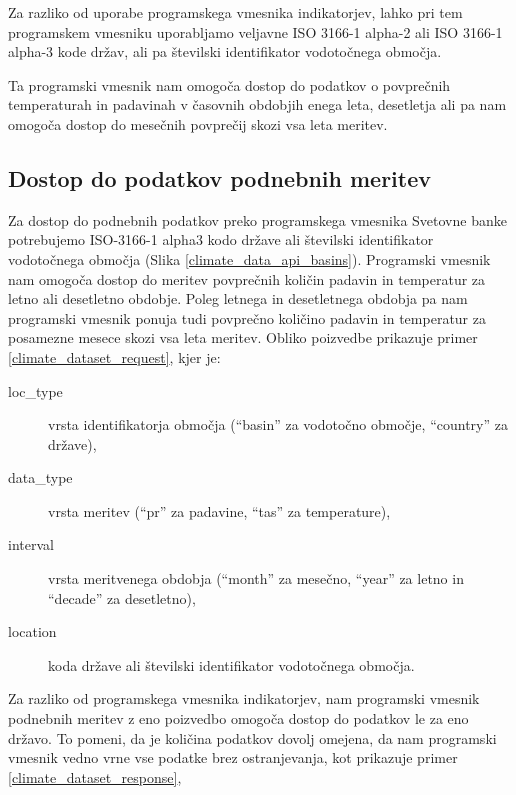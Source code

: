 Za razliko od uporabe programskega vmesnika indikatorjev, lahko pri tem
programskem vmesniku uporabljamo veljavne ISO 3166-1 alpha-2 ali ISO 3166-1 
alpha-3 kode držav, ali pa številski identifikator vodotočnega 
območja.

Ta programski vmesnik nam omogoča dostop do podatkov o povprečnih 
temperaturah in padavinah v časovnih obdobjih enega leta, desetletja ali pa 
nam omogoča dostop do mesečnih povprečij skozi vsa leta meritev.


\subsection{Dostop do podatkov podnebnih meritev}

Za dostop do podnebnih podatkov preko programskega vmesnika Svetovne banke
potrebujemo ISO-3166-1 alpha3 kodo države ali številski identifikator
vodotočnega območja (Slika \ref{climate_data_api_basins}). Programski vmesnik
nam omogoča dostop do meritev povprečnih količin padavin in temperatur za 
letno ali desetletno obdobje. Poleg letnega in desetletnega obdobja pa nam 
programski vmesnik ponuja tudi povprečno količino padavin in temperatur za 
posamezne mesece skozi vsa leta meritev. Obliko poizvedbe prikazuje primer 
\ref{climate_dataset_request}, kjer je:
\begin{description}
\item [loc\_type] vrsta identifikatorja območja (``basin'' za vodotočno območje, 
  ``country'' za države),
\item [data\_type] vrsta meritev (``pr'' za padavine, ``tas'' za temperature),
\item [interval] vrsta meritvenega obdobja (``month'' za mesečno, ``year'' za letno in
  ``decade'' za desetletno),
\item [location] koda države ali številski identifikator vodotočnega območja.
\end{description}
Za razliko od programskega vmesnika indikatorjev, nam programski vmesnik
podnebnih meritev z eno poizvedbo omogoča dostop do podatkov le za eno državo.
To pomeni, da je količina podatkov dovolj omejena, da nam programski vmesnik
vedno vrne vse podatke brez ostranjevanja, kot prikazuje primer 
\ref{climate_dataset_response},


